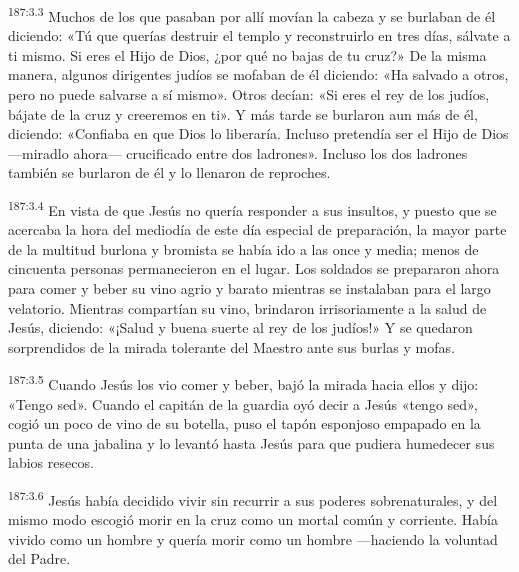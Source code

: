 \par 
\textsuperscript{187:3.3} Muchos de los que pasaban por allí movían la cabeza y se burlaban de él diciendo: «Tú que querías destruir el templo y reconstruirlo en tres días, sálvate a ti mismo. Si eres el Hijo de Dios, ¿por qué no bajas de tu cruz?» De la misma manera, algunos dirigentes judíos se mofaban de él diciendo: «Ha salvado a otros, pero no puede salvarse a sí mismo». Otros decían: «Si eres el rey de los judíos, bájate de la cruz y creeremos en ti». Y más tarde se burlaron aun más de él, diciendo: «Confiaba en que Dios lo liberaría. Incluso pretendía ser el Hijo de Dios ---miradlo ahora--- crucificado entre dos ladrones». Incluso los dos ladrones también se burlaron de él y lo llenaron de reproches.

\par 
\textsuperscript{187:3.4} En vista de que Jesús no quería responder a sus insultos, y puesto que se acercaba la hora del mediodía de este día especial de preparación, la mayor parte de la multitud burlona y bromista se había ido a las once y media; menos de cincuenta personas permanecieron en el lugar. Los soldados se prepararon ahora para comer y beber su vino agrio y barato mientras se instalaban para el largo velatorio. Mientras compartían su vino, brindaron irrisoriamente a la salud de Jesús, diciendo: «¡Salud y buena suerte al rey de los judíos!» Y se quedaron sorprendidos de la mirada tolerante del Maestro ante sus burlas y mofas.

\par 
\textsuperscript{187:3.5} Cuando Jesús los vio comer y beber, bajó la mirada hacia ellos y dijo: «Tengo sed». Cuando el capitán de la guardia oyó decir a Jesús «tengo sed», cogió un poco de vino de su botella, puso el tapón esponjoso empapado en la punta de una jabalina y lo levantó hasta Jesús para que pudiera humedecer sus labios resecos.

\par 
\textsuperscript{187:3.6} Jesús había decidido vivir sin recurrir a sus poderes sobrenaturales, y del mismo modo escogió morir en la cruz como un mortal común y corriente. Había vivido como un hombre y quería morir como un hombre ---haciendo la voluntad del Padre.

